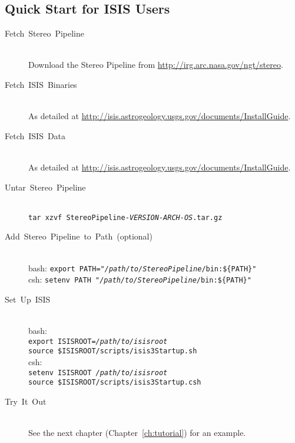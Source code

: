 \subsection{Quick Start for ISIS Users}
\begin{description}

\item[{Fetch~Stereo~Pipeline}] ~\\
Download the Stereo Pipeline from \url{http://irg.arc.nasa.gov/ngt/stereo}.

\item [{Fetch~ISIS~Binaries}] ~\\
As detailed at \url{http://isis.astrogeology.usgs.gov/documents/InstallGuide}.

\item [{Fetch~ISIS~Data}] ~\\
As detailed at \url{http://isis.astrogeology.usgs.gov/documents/InstallGuide}.

\item [{Untar~Stereo~Pipeline}] ~\\
\texttt{tar xzvf StereoPipeline-\textit{VERSION-ARCH-OS}.tar.gz}

\item [{Add~Stereo~Pipeline~to~Path~(optional)}] ~\\
bash: \texttt{export PATH="\textit{/path/to/StereoPipeline}/bin:\$\{PATH\}"} \\
csh:  \texttt{setenv PATH "\textit{/path/to/StereoPipeline}/bin:\$\{PATH\}"}

\item[Set~Up~ISIS] ~\\
bash: \\
\hspace*{2em}\texttt{export ISISROOT=\textit{/path/to/isisroot}} \\
\hspace*{2em}\texttt{source \$ISISROOT/scripts/isis3Startup.sh} \\
csh: \\
\hspace*{2em}\texttt{setenv ISISROOT \textit{/path/to/isisroot}} \\
\hspace*{2em}\texttt{source \$ISISROOT/scripts/isis3Startup.csh}

\item [{Try~It~Out}] ~\\
See the next chapter (Chapter~\ref{ch:tutorial}) for an example.
\end{description}

